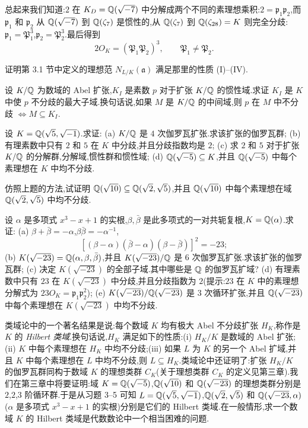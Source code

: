 \begin{example}
总起来我们知道:$2$ 在 $K_D=\mathbb{Q}(\sqrt{-7})$ 中分解成两个不同的素理想乘积:$2=\mathfrak{p}_1\mathfrak{p}_2$,而 $\mathfrak{p}_1$ 和 $\mathfrak{p}_2$ 从 $\mathbb{Q}(\sqrt{-7})$ 到 $\mathbb{Q}(\zeta_7)$ 是惯性的,从 $\mathbb{Q}(\zeta_7)$ 到 $\mathbb{Q}(\zeta_{28})=K$ 则完全分歧:$\mathfrak{p}_1=\mathfrak{P}_1^3$,$\mathfrak{p}_2=\mathfrak{P}_2^3$.最后得到
\[
  2O_K=(\mathfrak{P}_1\mathfrak{P}_2)^3,\qquad \mathfrak{P}_1\neq\mathfrak{P}_2.
\]
\end{example}

\begin{Exercises}
  \item 证明第 3.1 节中定义的理想范 $N_{L/K}(\mathfrak{a})$ 满足那里的性质 (I)--(IV).
  \item 设 $K/\mathbb{Q}$ 为数域的 Abel 扩张,$K_I$ 是素数 $p$ 对于扩张 $K/\mathbb{Q}$ 的惯性域.求证 $K_I$ 是 $K$ 中使 $p$ 不分歧的最大子域.换句话说,如果 $M$ 是 $K/\mathbb{Q}$ 的中间域,则 $p$ 在 $M$ 中不分歧 $\Leftrightarrow M\subseteq K_I$.
  \item 设 $K=\mathbb{Q}(\sqrt{5},\sqrt{-1})$.求证:
        (a) $K/\mathbb{Q}$ 是 $4$ 次伽罗瓦扩张.求该扩张的伽罗瓦群;
        (b) 有理素数中只有 $2$ 和 $5$ 在 $K$ 中分歧,并且分歧指数均是 $2$;
        (c) 求 $2$ 和 $5$ 对于扩张 $K/\mathbb{Q}$ 的分解群,分解域,惯性群和惯性域;
        (d) $\mathbb{Q}(\sqrt{-5})\subseteq K$,并且 $\mathbb{Q}(\sqrt{-5})$ 中每个素理想在 $K$ 中均不分歧.
  \item 仿照上题的方法,试证明 $\mathbb{Q}(\sqrt{10})\subseteq\mathbb{Q}(\sqrt{2},\sqrt{5})$,并且 $\mathbb{Q}(\sqrt{10})$ 中每个素理想在域 $\mathbb{Q}(\sqrt{2},\sqrt{5})$ 中均不分歧.
  \item 设 $\alpha$ 是多项式 $x^3-x+1$ 的实根,$\beta,\bar{\beta}$ 是此多项式的一对共轭复根,$K=\mathbb{Q}(\alpha)$.求证:
        (a) $\beta+\bar{\beta}=-\alpha$,$\beta\bar{\beta}=-\alpha^{-1}$,
        \[
          [(\beta-\alpha)(\bar{\beta}-\alpha)(\beta-\bar{\beta})]^2=-23;
        \]
        (b) $K(\sqrt{-23})=\mathbb{Q}(\alpha,\beta,\bar{\beta})$,并且 $K(\sqrt{-23})/\mathbb{Q}$ 是 $6$ 次伽罗瓦扩张.求该扩张的伽罗瓦群;
        (c) 决定 $K(\sqrt{-23})$ 的全部子域.其中哪些是 $\mathbb{Q}$ 的伽罗瓦扩域?
        (d) 有理素数中只有 $23$ 在 $K(\sqrt{-23})$ 中分歧,并且分歧指数为 $2$(提示:$23$ 在 $K$ 中的素理想分解式为 $23O_K=\mathfrak{p}_1\mathfrak{p}_2^2$);
        (e) $K(\sqrt{-23})/\mathbb{Q}(\sqrt{-23})$ 是 $3$ 次循环扩张,并且 $\mathbb{Q}(\sqrt{-23})$ 中每个素理想在 $K(\sqrt{-23})$ 中均不分歧.
\end{Exercises}

\begin{remark}
类域论中的一个著名结果是说:每个数域 $K$ 均有极大 Abel 不分歧扩张 $H_K$,称作是 $K$ 的 \emph{Hilbert 类域}.换句话说,$H_K$ 满足如下的性质:(i) $H_K/K$ 是数域的 Abel 扩张;(ii) $K$ 中每个素理想在 $H_K$ 中均不分歧;(iii) 如果 $L$ 为 $K$ 的另一个 Abel 扩域,并且 $K$ 中每个素理想在 $L$ 中均不分歧,则 $L\subseteq H_K$.类域论中还证明了:扩张 $H_K/K$ 的伽罗瓦群同构于数域 $K$ 的理想类群 $C_K$(关于理想类群 $C_K$ 的定义见第三章).我们在第三章中将要证明:域 $K=\mathbb{Q}(\sqrt{-5})$,$\mathbb{Q}(\sqrt{10})$ 和 $\mathbb{Q}(\sqrt{-23})$ 的理想类群分别是 $2$,$2$,$3$ 阶循环群.于是从习题 3--5 可知 $L=\mathbb{Q}(\sqrt{5},\sqrt{-1})$,$\mathbb{Q}(\sqrt{2},\sqrt{5})$ 和 $\mathbb{Q}(\sqrt{-23},\alpha)$($\alpha$ 是多项式 $x^3-x+1$ 的实根)分别是它们的 Hilbert 类域.在一般情形,求一个数域 $K$ 的 Hilbert 类域是代数数论中一个相当困难的问题.
\end{remark}

